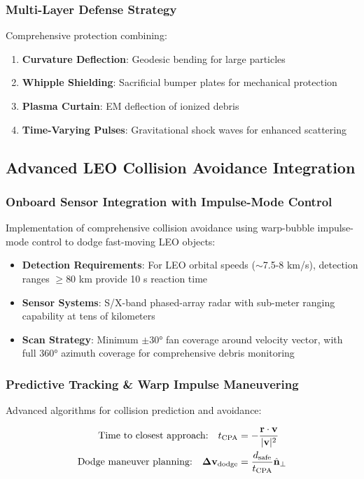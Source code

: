 \documentclass[11pt]{article}
\begin{document}
\subsubsection{Multi-Layer Defense Strategy}
Comprehensive protection combining:
\begin{enumerate}
\item \textbf{Curvature Deflection}: Geodesic bending for large particles
\item \textbf{Whipple Shielding}: Sacrificial bumper plates for mechanical protection  
\item \textbf{Plasma Curtain}: EM deflection of ionized debris
\item \textbf{Time-Varying Pulses}: Gravitational shock waves for enhanced scattering
\end{enumerate}

\subsection{Advanced LEO Collision Avoidance Integration}

\subsubsection{Onboard Sensor Integration with Impulse-Mode Control}
Implementation of comprehensive collision avoidance using warp-bubble impulse-mode control to dodge fast-moving LEO objects:

\begin{itemize}
\item \textbf{Detection Requirements}: For LEO orbital speeds ($\sim$7.5-8 km/s), detection ranges $\geq 80$ km provide 10 s reaction time
\item \textbf{Sensor Systems}: S/X-band phased-array radar with sub-meter ranging capability at tens of kilometers
\item \textbf{Scan Strategy}: Minimum $\pm 30°$ fan coverage around velocity vector, with full 360° azimuth coverage for comprehensive debris monitoring
\end{itemize}

\subsubsection{Predictive Tracking \& Warp Impulse Maneuvering}
Advanced algorithms for collision prediction and avoidance:

\begin{align}
\text{Time to closest approach:} \quad t_{\rm CPA} &= -\frac{\mathbf{r} \cdot \mathbf{v}}{|\mathbf{v}|^2} \\
\text{Dodge maneuver planning:} \quad \mathbf{\Delta v}_{\rm dodge} &= \frac{d_{\rm safe}}{t_{\rm CPA}} \hat{\mathbf{n}}_\perp
\end{align}
\end{document}
